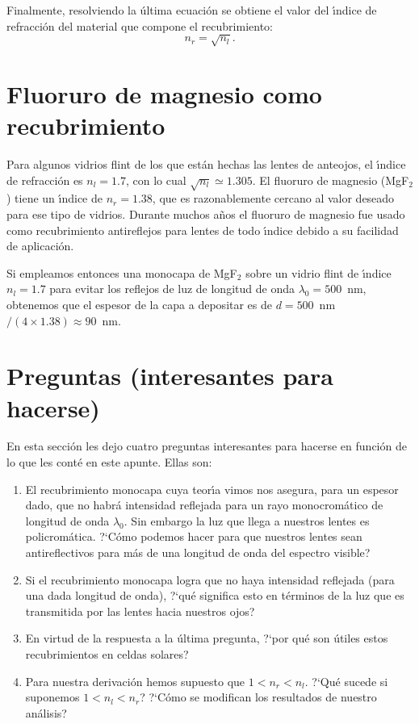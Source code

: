 \documentclass[a4paper]{article}
\begin{document}
Finalmente, resolviendo la \'ultima ecuaci\'on se obtiene el 
valor del \'\i ndice de refracci\'on del material que compone el
recubrimiento:
\begin{equation}
    n_r = \sqrt{n_l}.
\end{equation}

\section{Fluoruro de magnesio como recubrimiento}

Para algunos vidrios flint de los que est\'an hechas las lentes de anteojos,
el \'\i ndice de refracci\'on es $n_l = 1.7$, con lo cual $\sqrt{n_l} \simeq 
1.305$. El fluoruro de magnesio (MgF$_2$) tiene un \'\i ndice de $n_r = 1.38$,
que es razonablemente cercano al valor deseado para ese tipo de vidrios. Durante 
muchos a\~nos el fluoruro de magnesio fue usado como recubrimiento antireflejos
para lentes de todo \'\i ndice debido a su facilidad de aplicaci\'on. 

Si empleamos entonces una monocapa de MgF$_2$ sobre un vidrio flint de 
\'\i ndice $n_l = 1.7$ para evitar los reflejos de luz de longitud de onda
$\lambda_0 = 500$~nm, obtenemos que el espesor de la capa a depositar es de
$d = 500$~nm$/(4 \times 1.38) \approx 90$~nm.

\newpage

\section{Preguntas (interesantes para hacerse)}

En esta secci\'on les dejo cuatro preguntas interesantes para hacerse en
funci\'on de lo que les cont\'e en este apunte. Ellas son:
\begin{enumerate}
    \item El recubrimiento monocapa cuya teor\'\i a vimos nos asegura, para 
        un espesor dado, que no habr\'a intensidad reflejada para un rayo 
        monocrom\'atico de longitud de onda $\lambda_0$. Sin embargo la 
        luz que llega a nuestros lentes es policrom\'atica. ?`C\'omo podemos
        hacer para que nuestros lentes sean antireflectivos para m\'as de 
        una longitud de onda del espectro visible? 
    \item Si el recubrimiento monocapa logra que no haya intensidad reflejada 
        (para  una dada longitud de onda), ?`qu\'e significa esto en t\'erminos
        de la luz que es transmitida por las lentes hacia nuestros ojos? 
    \item En virtud de la respuesta a la \'ultima pregunta, ?`por qu\'e son
        \'utiles estos recubrimientos en celdas solares? 
    \item Para nuestra derivaci\'on hemos supuesto que $1 < n_r < n_l$. 
        ?`Qu\'e sucede si suponemos $1 < n_l < n_r$? ?`C\'omo se modifican los 
        resultados de nuestro an\'alisis? 
\end{enumerate}


\end{document}

